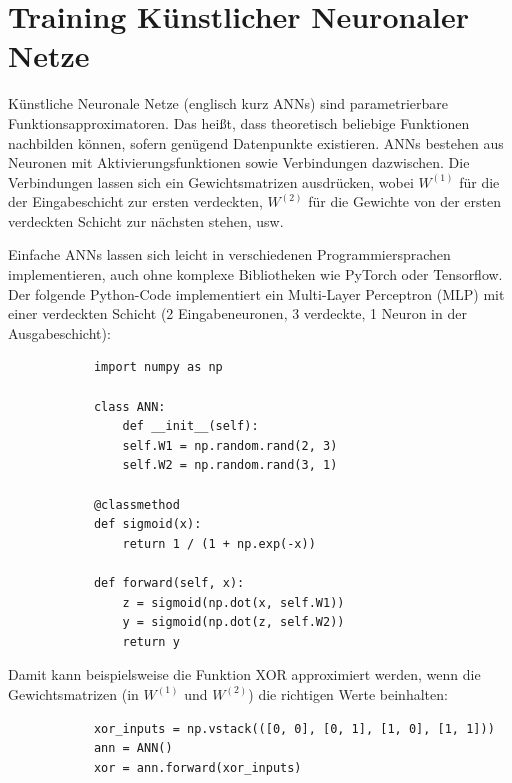 \chapter{Training Künstlicher Neuronaler Netze}
\label{ch:03_training-artificial-neural-networks}

\begin{universityTask}
    Künstliche Neuronale Netze (englisch kurz ANNs) sind parametrierbare Funktionsapproximatoren. Das heißt, dass theoretisch beliebige Funktionen nachbilden können, sofern genügend Datenpunkte existieren. ANNs bestehen aus Neuronen mit Aktivierungsfunktionen sowie Verbindungen dazwischen. Die Verbindungen lassen sich ein Gewichtsmatrizen ausdrücken, wobei $W^{(1)}$ für die der Eingabeschicht zur ersten verdeckten, $W^{(2)}$ für die Gewichte von der ersten verdeckten Schicht zur nächsten stehen, usw.

    Einfache ANNs lassen sich leicht in verschiedenen Programmiersprachen implementieren, auch ohne komplexe Bibliotheken wie PyTorch oder Tensorflow. Der folgende Python-Code implementiert ein Multi-Layer Perceptron (MLP) mit einer verdeckten Schicht (2 Eingabeneuronen, 3 verdeckte, 1 Neuron in der Ausgabeschicht):

    \begin{snippet}[H]
        \centering
        \begin{verbatim}
            import numpy as np

            class ANN:
                def __init__(self):
                self.W1 = np.random.rand(2, 3)
                self.W2 = np.random.rand(3, 1)

            @classmethod
            def sigmoid(x):
                return 1 / (1 + np.exp(-x))

            def forward(self, x):
                z = sigmoid(np.dot(x, self.W1))
                y = sigmoid(np.dot(z, self.W2))
                return y
        \end{verbatim}
    \end{snippet}

    Damit kann beispielsweise die Funktion XOR approximiert werden, wenn die Gewichtsmatrizen (in $W^{(1)}$ und $W^{(2)}$) die richtigen Werte beinhalten:

    \begin{snippet}[H]
        \centering
        \begin{verbatim}
            xor_inputs = np.vstack(([0, 0], [0, 1], [1, 0], [1, 1]))
            ann = ANN()
            xor = ann.forward(xor_inputs)
        \end{verbatim}
    \end{snippet}
\end{universityTask}

